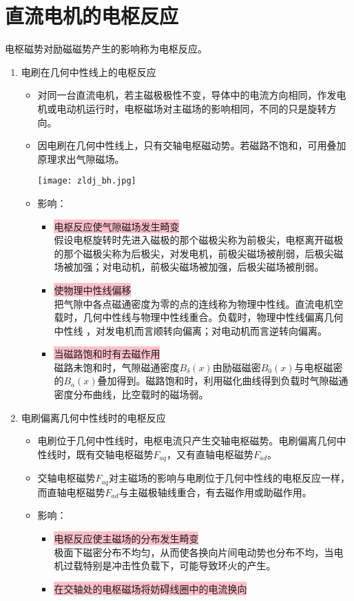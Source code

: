 \documentclass[blue]{elegantnote}
\begin{document}
\section{直流电机的电枢反应}
电枢磁势对励磁磁势产生的影响称为电枢反应。
\begin{enumerate}
	\item 电刷在几何中性线上的电枢反应
	\begin{itemize}
		\item 对同一台直流电机，若主磁极极性不变，导体中的电流方向相同，作发电机或电动机运行时，电枢磁场对主磁场的影响相同，不同的只是旋转方向。
		\item 因电刷在几何中性线上，只有交轴电枢磁动势。若磁路不饱和，可用叠加原理求出气隙磁场。
	\begin{center}
		\texttt{[image: zldj\_bh.jpg]}
	\end{center}
		\item 影响：
		\begin{itemize}
			\item \colorbox{pink}{电枢反应使气隙磁场发生畸变}\\
			假设电枢旋转时先进入磁极的那个磁极尖称为前极尖，电枢离开磁极的那个磁极尖称为后极尖，对发电机，前极尖磁场被削弱，后极尖磁场被加强；对电动机，前极尖磁场被加强，后极尖磁场被削弱。
			\item \colorbox{pink}{使物理中性线偏移}\\
			把气隙中各点磁通密度为零的点的连线称为物理中性线。直流电机空载时，几何中性线与物理中性线重合。负载时，物理中性线偏离几何中性线 ，对发电机而言顺转向偏离；对电动机而言逆转向偏离。 
			\item \colorbox{pink}{当磁路饱和时有去磁作用}\\
			磁路未饱和时，气隙磁通密度$B_{\delta}(x)$由励磁磁密$B_{0}(x)$与电枢磁密的$B_{a}(x)$叠加得到。磁路饱和时，利用磁化曲线得到负载时气隙磁通密度分布曲线，比空载时的磁场弱。
		\end{itemize}			
	\end{itemize}
	\item 电刷偏离几何中性线时的电枢反应 
	\begin{itemize}
		\item 电刷位于几何中性线时，电枢电流只产生交轴电枢磁势。电刷偏离几何中性线时，既有交轴电枢磁势$F_{aq}$，又有直轴电枢磁势$F_{ad}$。
		\item 交轴电枢磁势$F_{aq}$对主磁场的影响与电刷位于几何中性线的电枢反应一样，而直轴电枢磁势$F_{ad}$与主磁极轴线重合，有去磁作用或助磁作用。
		\item 影响：
		\begin{itemize}
			\item \colorbox{pink}{电枢反应使主磁场的分布发生畸变}\\
		极面下磁密分布不均匀，从而使各换向片间电动势也分布不均，当电机过载特别是冲击性负载下，可能导致环火的产生。
			\item \colorbox{pink}{在交轴处的电枢磁场将妨碍线圈中的电流换向}
		\end{itemize}
	\end{itemize}
\end{enumerate}
\end{document}
